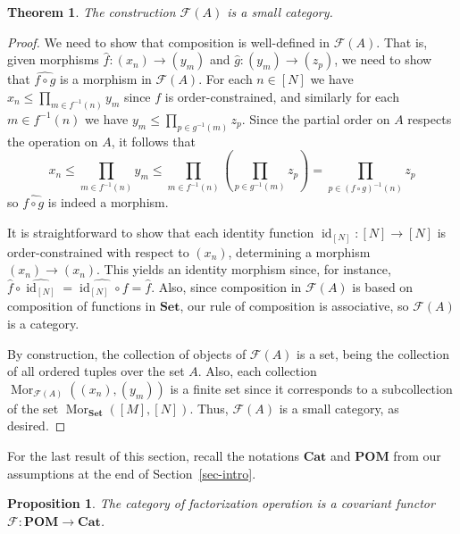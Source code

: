 \documentclass[reqno]{amsart}
\theoremstyle{plain}
\newtheorem{prop}[lem]{Proposition}
\newtheorem{thm}[lem]{Theorem}
\theoremstyle{definition}
\newcommand{\cat}[1]{\mathcal{#1}}
\newcommand{\catf}{\cat{F}}
\newcommand{\id}{\operatorname{id}}
\renewcommand{\leq}{\leqslant}
\newcommand{\mor}[3]{\operatorname{Mor}_{#1}(#2,#3)}
\newcommand{\catset}{\mathbf{Set}}
\newcommand{\catcat}{\mathbf{Cat}}
\newcommand{\catpom}{\mathbf{POM}}
\numberwithin{equation}{lem}
\begin{document}
\begin{thm}\label{cat-is-small-cat}
The construction
$\mathcal{F}(A)$ is a small category.
\end{thm}

\begin{proof}
We need to show that composition is well-defined in $\catf(A)$.
That is, given morphisms $\hat f\colon (x_n)\to(y_m)$ and $\hat g\colon(y_m)\to(z_p)$, we need to show that
$\widehat{f\circ g}$ is a morphism in $\catf(A)$. For each $n\in[N]$ we have
$x_n \leq \prod_{m \in f^{-1}(n)} y_m$ since $f$ is order-constrained,
and similarly for each $m\in f^{-1}(n)$ we have
$y_m \leq \prod_{p \in g^{-1}(m)} z_p$.
Since the partial order on $A$ respects the operation on $A$, it follows that
$$\textstyle
x_n \leq \prod_{m \in f^{-1}(n)} y_m\leq \prod_{m \in f^{-1}(n)}\left(\prod_{p \in g^{-1}(m)} z_p\right)=\prod_{p \in (f\circ g)^{-1}(n)} z_p$$
so $\widehat{f\circ g}$ is indeed a morphism.

It is straightforward to show that each identity function $\id_{[N]}\colon[N]\to[N]$ 
is order-constrained with respect to $(x_n)$, determining a morphism $(x_n)\to(x_n)$. 
This yields an identity morphism since, for instance,
$\hat f\circ\widehat{\id_{[N]}}=\widehat{\id_{[N]}\circ f}=\hat f$.
Also, since composition in $\catf(A)$ is based on composition of functions in $\catset$, our rule of composition is
associative, so $\catf(A)$ is a category.

By construction, the collection of objects of $\catf(A)$ is a set, being the collection of all ordered tuples over the set $A$.
Also, each collection $\mor{\catf(A)}{(x_n)}{(y_m)}$ is a finite set since it corresponds to a subcollection of the set
$\mor{\catset}{[M]}{[N]}$.
Thus, $\catf(A)$ is a small category, as desired.
\end{proof}

For the last result of this section, recall the notations $\catcat$ and $\catpom$ from our assumptions at the end of 
Section~\ref{sec-intro}.

\begin{prop}\label{prop170430d}
The category of factorization operation is a covariant functor $\catf\colon\catpom\to\catcat$.
\end{prop}
\end{document}
